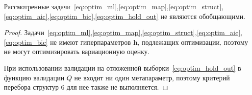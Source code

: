 \begin{theorem}Рассмотренные задачи~\eqref{eq:optim_ml},\eqref{eq:optim_map},\eqref{eq:optim_struct},\eqref{eq:optim_aic},\eqref{eq:optim_bic},\eqref{eq:optim_hold_out} не являются обобщающими.
\end{theorem}
\begin{proof}
Задачи~\eqref{eq:optim_ml},\eqref{eq:optim_map},\eqref{eq:optim_struct},\eqref{eq:optim_aic},\eqref{eq:optim_bic} не имеют гиперпараметров $\mathbf{h}$, подлежащих оптимизации, поэтому не могут оптимизировать вариационную оценку.

При  использовании валидации на отложенной выборки~\eqref{eq:optim_hold_out} в функцию валидации $Q$ не входит ни один метапараметр, поэтому критерий перебора структур 6 для нее также не выполняется. 

\end{proof}

